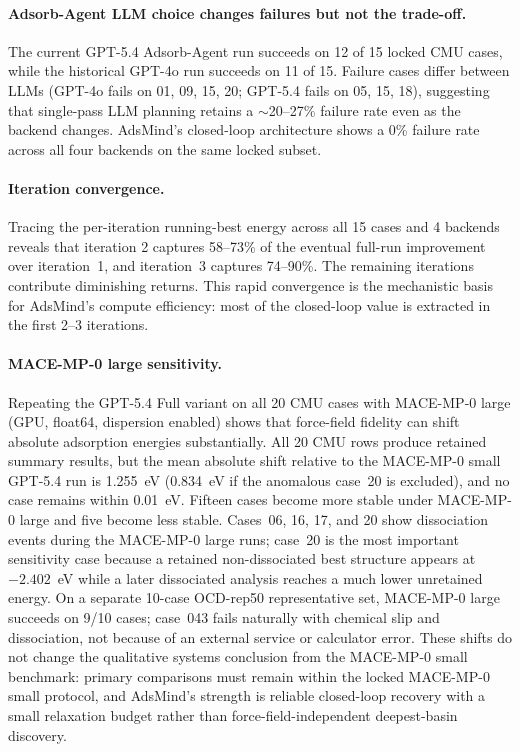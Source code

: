 \paragraph{Adsorb-Agent LLM choice changes failures but not the trade-off.}
The current GPT-5.4 Adsorb-Agent run succeeds on 12 of 15 locked CMU cases, while the historical GPT-4o run succeeds on 11 of 15.
Failure cases differ between LLMs (GPT-4o fails on 01, 09, 15, 20; GPT-5.4 fails on 05, 15, 18), suggesting that single-pass LLM planning retains a $\sim$20--27\% failure rate even as the backend changes.
AdsMind's closed-loop architecture shows a 0\% failure rate across all four backends on the same locked subset.

\paragraph{Iteration convergence.}
Tracing the per-iteration running-best energy across all 15 cases and 4 backends reveals that iteration 2 captures 58--73\% of the eventual full-run improvement over iteration~1, and iteration~3 captures 74--90\%.
The remaining iterations contribute diminishing returns.
This rapid convergence is the mechanistic basis for AdsMind's compute efficiency: most of the closed-loop value is extracted in the first 2--3 iterations.

\paragraph{MACE-MP-0 large sensitivity.}
Repeating the GPT-5.4 Full variant on all 20 CMU cases with MACE-MP-0 large (GPU, float64, dispersion enabled) shows that force-field fidelity can shift absolute adsorption energies substantially.
All 20 CMU rows produce retained summary results, but the mean absolute shift relative to the MACE-MP-0 small GPT-5.4 run is 1.255~eV (0.834~eV if the anomalous case~20 is excluded), and no case remains within 0.01~eV.
Fifteen cases become more stable under MACE-MP-0 large and five become less stable.
Cases~06, 16, 17, and 20 show dissociation events during the MACE-MP-0 large runs; case~20 is the most important sensitivity case because a retained non-dissociated best structure appears at $-2.402$~eV while a later dissociated analysis reaches a much lower unretained energy.
On a separate 10-case OCD-rep50 representative set, MACE-MP-0 large succeeds on 9/10 cases; case~043 fails naturally with chemical slip and dissociation, not because of an external service or calculator error.
These shifts do not change the qualitative systems conclusion from the MACE-MP-0 small benchmark: primary comparisons must remain within the locked MACE-MP-0 small protocol, and AdsMind's strength is reliable closed-loop recovery with a small relaxation budget rather than force-field-independent deepest-basin discovery.

